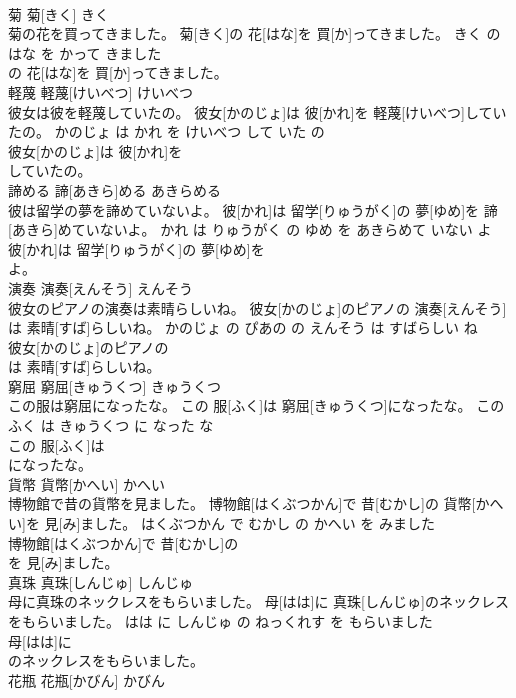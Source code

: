 \documentclass[8pt]{extreport}
\begin{document}
\begin{CJK}{UTF8}{min}
\\	菊	菊[きく]	きく	
\\	菊の花を買ってきました。	菊[きく]の 花[はな]を 買[か]ってきました。	きく の はな を かって きました	
\\	の 花[はな]を 買[か]ってきました。			
\\	軽蔑	軽蔑[けいべつ]	けいべつ	
\\	彼女は彼を軽蔑していたの。	彼女[かのじょ]は 彼[かれ]を 軽蔑[けいべつ]していたの。	かのじょ は かれ を けいべつ して いた の	
\\	彼女[かのじょ]は 彼[かれ]を
\\	していたの。			
\\	諦める	諦[あきら]める	あきらめる	
\\	彼は留学の夢を諦めていないよ。	彼[かれ]は 留学[りゅうがく]の 夢[ゆめ]を 諦[あきら]めていないよ。	かれ は りゅうがく の ゆめ を あきらめて いない よ	
\\	彼[かれ]は 留学[りゅうがく]の 夢[ゆめ]を
\\	よ。			
\\	演奏	演奏[えんそう]	えんそう	
\\	彼女のピアノの演奏は素晴らしいね。	彼女[かのじょ]のピアノの 演奏[えんそう]は 素晴[すば]らしいね。	かのじょ の ぴあの の えんそう は すばらしい ね	
\\	彼女[かのじょ]のピアノの
\\	は 素晴[すば]らしいね。			
\\	窮屈	窮屈[きゅうくつ]	きゅうくつ	
\\	この服は窮屈になったな。	この 服[ふく]は 窮屈[きゅうくつ]になったな。	この ふく は きゅうくつ に なった な	
\\	この 服[ふく]は
\\	になったな。			
\\	貨幣	貨幣[かへい]	かへい	
\\	博物館で昔の貨幣を見ました。	博物館[はくぶつかん]で 昔[むかし]の 貨幣[かへい]を 見[み]ました。	はくぶつかん で むかし の かへい を みました	
\\	博物館[はくぶつかん]で 昔[むかし]の
\\	を 見[み]ました。			
\\	真珠	真珠[しんじゅ]	しんじゅ	
\\	母に真珠のネックレスをもらいました。	母[はは]に 真珠[しんじゅ]のネックレスをもらいました。	はは に しんじゅ の ねっくれす を もらいました	
\\	母[はは]に
\\	のネックレスをもらいました。			
\\	花瓶	花瓶[かびん]	かびん	

\end{CJK}
\end{document}
